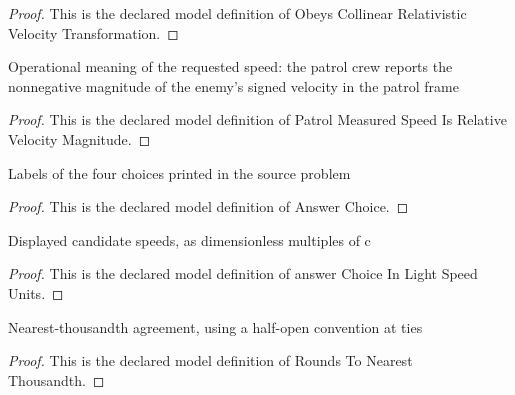 \begin{proof}
  This is the declared model definition of Obeys Collinear Relativistic Velocity Transformation.
\end{proof}
\begin{definition}
  \label{def:physics:phyx-mini-0527:phyxminiproblems-problemphyxmini0527-patrolmeasuredspeedisrelativevelocitymagnitude}
  Operational meaning of the requested speed: the patrol crew reports the nonnegative magnitude of the enemy's signed velocity in the patrol frame
\end{definition}
\begin{proof}
  This is the declared model definition of Patrol Measured Speed Is Relative Velocity Magnitude.
\end{proof}
\begin{definition}
  \label{def:physics:phyx-mini-0527:phyxminiproblems-problemphyxmini0527-answerchoice}
  Labels of the four choices printed in the source problem
\end{definition}
\begin{proof}
  This is the declared model definition of Answer Choice.
\end{proof}
\begin{definition}
  \label{def:physics:phyx-mini-0527:phyxminiproblems-problemphyxmini0527-answerchoiceinlightspeedunits}
  Displayed candidate speeds, as dimensionless multiples of c
\end{definition}
\begin{proof}
  This is the declared model definition of answer Choice In Light Speed Units.
\end{proof}
\begin{definition}
  \label{def:physics:phyx-mini-0527:phyxminiproblems-problemphyxmini0527-roundstonearestthousandth}
  Nearest-thousandth agreement, using a half-open convention at ties
\end{definition}
\begin{proof}
  This is the declared model definition of Rounds To Nearest Thousandth.
\end{proof}
